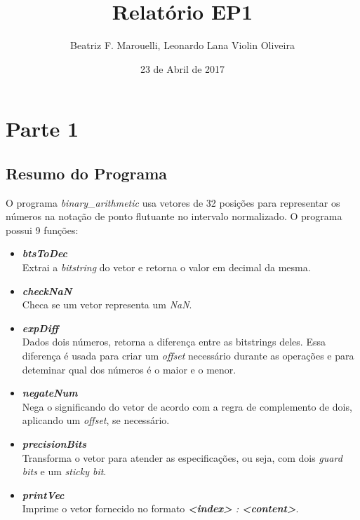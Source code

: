 \documentclass{article}
\title{Relatório EP1}
\author{Beatriz F. Marouelli, Leonardo Lana Violin Oliveira}
\date{23 de Abril de 2017}
\begin{document}
\maketitle

\section*{Parte 1}
\subsection*{Resumo do Programa}

O programa \textit{binary\_arithmetic} usa vetores de 32 posições para
representar os números na notação de ponto flutuante no intervalo normalizado.
O programa possui 9 funções:

\begin{itemize}
    \item \textbf{\textit{btsToDec}}
        \\ Extrai a \textit{bitstring} do vetor e retorna o valor em decimal da mesma.
    
    \item \textbf{\textit{checkNaN}} 
        \\ Checa se um vetor representa um \textit{NaN}.
    
    \item \textbf{\textit{expDiff}}
        \\ Dados dois números, retorna a diferença entre as bitstrings deles.
        Essa diferença é usada para criar um \textit{offset} necessário durante
        as operações e para deteminar qual dos números é o maior e o menor.
    
    \item \textbf{\textit{negateNum}}
        \\ Nega o significando do vetor de acordo com a regra de complemento de
        dois, aplicando um \textit{offset}, se necessário.
    
    \item \textbf{\textit{precisionBits}}
        \\ Transforma o vetor para atender as especificações, ou seja, com dois
        \textit{guard bits} e um \textit{sticky bit}.
    
    \item \textbf{\textit{printVec}}
        \\ Imprime o vetor fornecido no formato \textit{\textbf{<index>} :
            \textbf{<content>}}.
    

\end{itemize}
\end{document}
